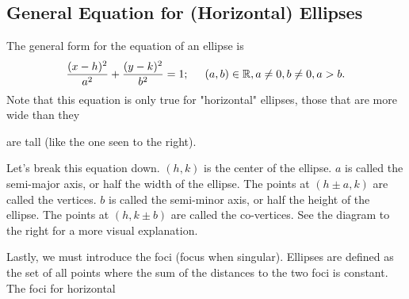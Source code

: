 \documentclass[../book.tex]{subfiles}
\begin{document}
\subsection{General Equation for (Horizontal) Ellipses}
\noindent The general form for the equation of an ellipse is
$$ \frac{(x-h)^2}{a^2} + \frac{(y-k)^2}{b^2} = 1; \hspace{5mm} (a,b)\in\mathbb{R},a\neq 0,b\neq 0,a>b.$$
Note that this equation is only true for "horizontal" ellipses, those that are more wide than they 

\begin{wrapfigure}{r}{5cm}
\centering
\end{wrapfigure}   

\noindent are tall (like the one seen to the right).     

Let's break this equation down.  $(h,k)$ is the center of the ellipse.  $a$ is called the semi-major axis, or half the width of the ellipse.  The points at $ (h \pm a, k) $ are called the vertices.  $b$ is called the semi-minor axis, or half the height of the ellipse.  The points at $ (h,k \pm b) $ are called the co-vertices.  See the diagram to the right for a more visual explanation.

Lastly, we must introduce the foci (focus when singular).  Ellipses are defined as the set of all points where the sum of the distances to the two foci is constant.  The foci for horizontal

\begin{wrapfigure}{r}{5cm}
\end{wrapfigure}
\end{document}
